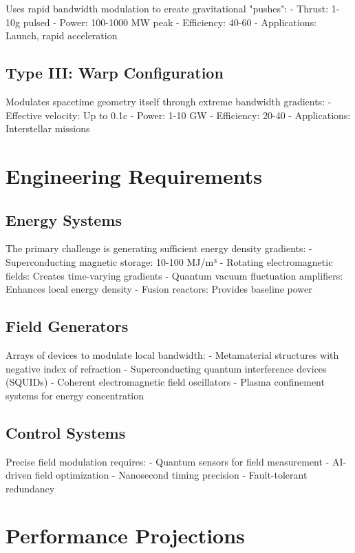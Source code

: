 \documentclass[12pt,letterpaper]{book}
\theoremstyle{definition}
\theoremstyle{plain}
\theoremstyle{remark}
\begin{document}
Uses rapid bandwidth modulation to create gravitational "pushes":
- Thrust: 1-10g pulsed
- Power: 100-1000 MW peak
- Efficiency: 40-60%
- Applications: Launch, rapid acceleration

\subsection{Type III: Warp Configuration}

Modulates spacetime geometry itself through extreme bandwidth gradients:
- Effective velocity: Up to 0.1c
- Power: 1-10 GW
- Efficiency: 20-40%
- Applications: Interstellar missions

\section{Engineering Requirements}

\subsection{Energy Systems}

The primary challenge is generating sufficient energy density gradients:
- Superconducting magnetic storage: 10-100 MJ/m³
- Rotating electromagnetic fields: Creates time-varying gradients
- Quantum vacuum fluctuation amplifiers: Enhances local energy density
- Fusion reactors: Provides baseline power

\subsection{Field Generators}

Arrays of devices to modulate local bandwidth:
- Metamaterial structures with negative index of refraction
- Superconducting quantum interference devices (SQUIDs)
- Coherent electromagnetic field oscillators
- Plasma confinement systems for energy concentration

\subsection{Control Systems}

Precise field modulation requires:
- Quantum sensors for field measurement
- AI-driven field optimization
- Nanosecond timing precision
- Fault-tolerant redundancy

\section{Performance Projections}
\end{document}
